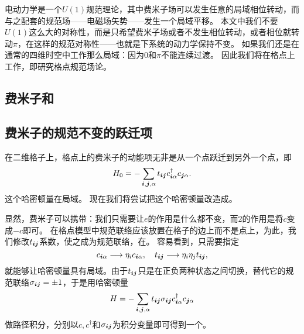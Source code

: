 电动力学是一个$U(1)$规范理论，其中费米子场可以发生任意的局域相位转动，而与之配套的规范场——电磁场矢势——发生一个局域平移。
本文中我们不要$U(1)$这么大的对称性，而是只希望费米子场或者不发生相位转动，或者相位就转动$\pi$，在这样的规范对称性——也就是下系统的动力学保持不变。
如果我们还是在通常的四维时空中工作那么局域：因为$0$和$\pi$不能连续过渡。
因此我们将在格点上工作，即研究格点规范场论。

\subsection{费米子和}

\subsection{费米子的规范不变的跃迁项}

在二维格子上，格点上的费米子的动能项无非是从一个点跃迁到另外一个点，即
\begin{equation}
    {H}_0 = - \sum_{\vb*{i}, \vb*{j}, \alpha} t_{\vb*{i} \vb*{j}} {c}_{\vb*{i} \alpha}^\dagger {c}_{\vb*{j} \alpha}.
    \label{eq:hopping-hamiltonian}
\end{equation}
这个哈密顿量在局域。
现在我们将尝试把这个哈密顿量改造成。

显然，费米子可以携带：我们只需要让$e$的作用是什么都不变，而$2$的作用是将$c$变成$-c$即可。
在格点模型中规范联络应该放置在格子的边上而不是点上，为此，我们修改$t_{\vb*{i} \vb*{j}}$系数，使之成为规范联络，在。
容易看到，只需要指定
\[
    {c}_{\vb*{i} \alpha} \longrightarrow \eta_{i} {c}_{\vb*{i} \alpha}, \quad t_{\vb*{i} \vb*{j}} \longrightarrow \eta_i \eta_j t_{\vb*{i} \vb*{j}},
\]
就能够让哈密顿量具有局域。由于$t_{\vb*{i} \vb*{j}}$只是在正负两种状态之间切换，替代它的规范联络$\sigma_{\vb*{i} \vb*{j}} = \pm 1$，于是用哈密顿量
\[
    {H} = - \sum_{\vb*{i}, \vb*{j}, \alpha} t_{\vb*{i} \vb*{j}} \sigma_{\vb*{i} \vb*{j}} {c}_{\vb*{i} \alpha}^\dagger {c}_{\vb*{j} \alpha}
\]
做路径积分，分别以${c}, {c}^\dagger$和$\sigma_{\vb*{i} \vb*{j}}$为积分变量即可得到一个。

